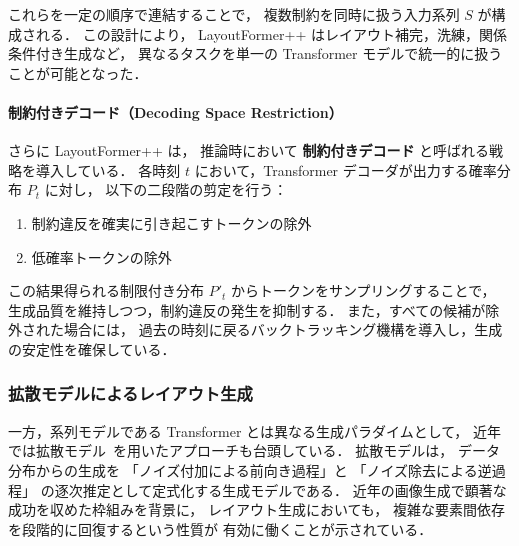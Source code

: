 \documentclass[a4j,12pt,dvipdfmx]{jsreport}
\begin{document}
これらを一定の順序で連結することで，
複数制約を同時に扱う入力系列 $S$ が構成される．
この設計により，
LayoutFormer++ はレイアウト補完，洗練，関係条件付き生成など，
異なるタスクを単一の Transformer モデルで統一的に扱うことが可能となった．

\paragraph{制約付きデコード（Decoding Space Restriction）}
さらに LayoutFormer++ は，
推論時において \textbf{制約付きデコード} と呼ばれる戦略を導入している．
各時刻 $t$ において，Transformer デコーダが出力する確率分布 $P_t$ に対し，
以下の二段階の剪定を行う：
\begin{enumerate}
   \item 制約違反を確実に引き起こすトークンの除外
   \item 低確率トークンの除外
\end{enumerate}

この結果得られる制限付き分布 $P'_t$ からトークンをサンプリングすることで，
生成品質を維持しつつ，制約違反の発生を抑制する．
また，すべての候補が除外された場合には，
過去の時刻に戻るバックトラッキング機構を導入し，生成の安定性を確保している．



\subsubsection{拡散モデルによるレイアウト生成}
一方，系列モデルである Transformer とは異なる生成パラダイムとして，
近年では拡散モデル~\cite{ho2020ddpm}を用いたアプローチも台頭している．
拡散モデルは，
データ分布からの生成を
「ノイズ付加による前向き過程」と
「ノイズ除去による逆過程」
の逐次推定として定式化する生成モデルである．
近年の画像生成で顕著な成功を収めた枠組みを背景に，
レイアウト生成においても，
複雑な要素間依存を段階的に回復するという性質が
有効に働くことが示されている．
\end{document}
